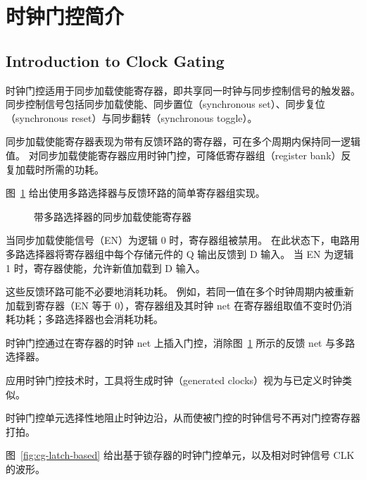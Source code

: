 \section{时钟门控简介}
\subsection*{Introduction to Clock Gating}

时钟门控适用于同步加载使能寄存器，即共享同一时钟与同步控制信号的触发器。
同步控制信号包括同步加载使能、同步置位（synchronous set）、同步复位（synchronous reset）与同步翻转（synchronous toggle）。

同步加载使能寄存器表现为带有反馈环路的寄存器，可在多个周期内保持同一逻辑值。
对同步加载使能寄存器应用时钟门控，可降低寄存器组（register bank）反复加载时所需的功耗。

图~\ref{fig:cg-sync-le-mux} 给出使用多路选择器与反馈环路的简单寄存器组实现。

\begin{figure}[htbp]
\centering
{}
\caption{带多路选择器的同步加载使能寄存器}
\label{fig:cg-sync-le-mux}
\end{figure}

当同步加载使能信号（EN）为逻辑 0 时，寄存器组被禁用。
在此状态下，电路用多路选择器将寄存器组中每个存储元件的 Q 输出反馈到 D 输入。
当 EN 为逻辑 1 时，寄存器使能，允许新值加载到 D 输入。

这些反馈环路可能不必要地消耗功耗。
例如，若同一值在多个时钟周期内被重新加载到寄存器（EN 等于 0），寄存器组及其时钟 net 在寄存器组取值不变时仍消耗功耗；多路选择器也会消耗功耗。

时钟门控通过在寄存器的时钟 net 上插入门控，消除图~\ref{fig:cg-sync-le-mux} 所示的反馈 net 与多路选择器。

\begin{noteBox}
应用时钟门控技术时，工具将生成时钟（generated clocks）视为与已定义时钟类似。
\end{noteBox}

时钟门控单元选择性地阻止时钟边沿，从而使被门控的时钟信号不再对门控寄存器打拍。

图~\ref{fig:cg-latch-based} 给出基于锁存器的时钟门控单元，以及相对时钟信号 CLK 的波形。

